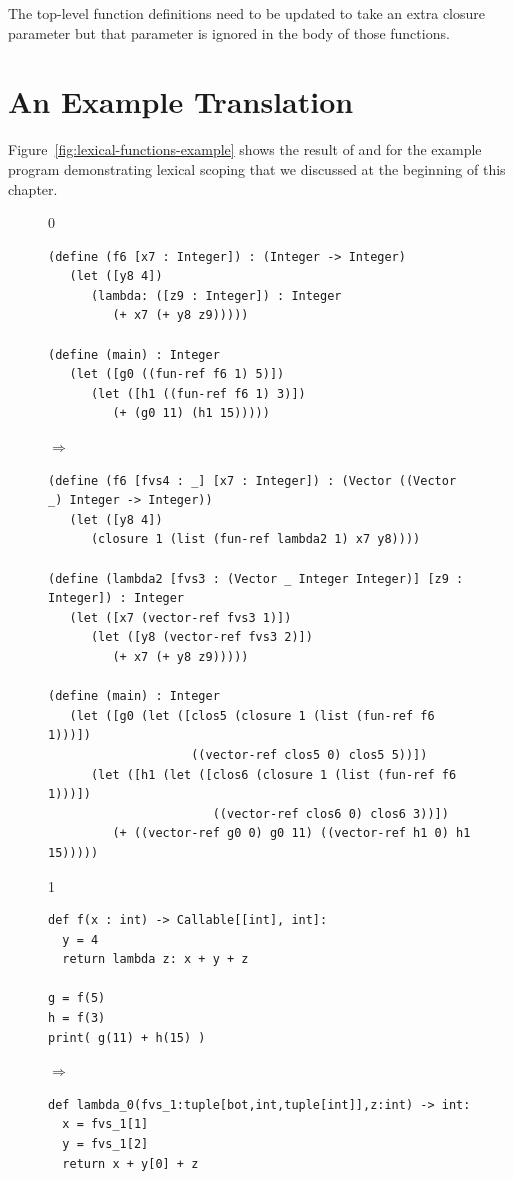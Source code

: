 \documentclass[7x10]{TimesAPriori_MIT}%
\def\racketEd{0}
\def\pythonEd{1}
\def\edition{0}
\numberwithin{theorem}{chapter}
\numberwithin{definition}{chapter}
\numberwithin{equation}{chapter}
\begin{document}
The top-level function definitions need to be updated to take an extra
closure parameter but that parameter is ignored in the body of those
functions.

\section{An Example Translation}
\label{sec:example-lambda}

Figure~\ref{fig:lexical-functions-example} shows the result of
 and  for the example
program demonstrating lexical scoping that we discussed at the
beginning of this chapter.


\begin{figure}[tbp]
  \begin{tcolorbox}[colback=white]
    \begin{minipage}{0.8\textwidth}
{\if\edition\racketEd
\begin{lstlisting}[basicstyle=\ttfamily\footnotesize]
(define (f6 [x7 : Integer]) : (Integer -> Integer)
   (let ([y8 4])
      (lambda: ([z9 : Integer]) : Integer
         (+ x7 (+ y8 z9)))))

(define (main) : Integer
   (let ([g0 ((fun-ref f6 1) 5)])
      (let ([h1 ((fun-ref f6 1) 3)])
         (+ (g0 11) (h1 15)))))
\end{lstlisting}
$\Rightarrow$
\begin{lstlisting}[basicstyle=\ttfamily\footnotesize]
(define (f6 [fvs4 : _] [x7 : Integer]) : (Vector ((Vector _) Integer -> Integer))
   (let ([y8 4])
      (closure 1 (list (fun-ref lambda2 1) x7 y8))))

(define (lambda2 [fvs3 : (Vector _ Integer Integer)] [z9 : Integer]) : Integer
   (let ([x7 (vector-ref fvs3 1)])
      (let ([y8 (vector-ref fvs3 2)])
         (+ x7 (+ y8 z9)))))

(define (main) : Integer
   (let ([g0 (let ([clos5 (closure 1 (list (fun-ref f6 1)))])
                    ((vector-ref clos5 0) clos5 5))])
      (let ([h1 (let ([clos6 (closure 1 (list (fun-ref f6 1)))])
                       ((vector-ref clos6 0) clos6 3))])
         (+ ((vector-ref g0 0) g0 11) ((vector-ref h1 0) h1 15)))))
\end{lstlisting}
\fi}
%
{\if\edition\pythonEd
\begin{lstlisting}
def f(x : int) -> Callable[[int], int]:
  y = 4
  return lambda z: x + y + z

g = f(5)
h = f(3)
print( g(11) + h(15) )
\end{lstlisting}
$\Rightarrow$
\begin{lstlisting}
def lambda_0(fvs_1:tuple[bot,int,tuple[int]],z:int) -> int:
  x = fvs_1[1]
  y = fvs_1[2]
  return x + y[0] + z


\end{lstlisting}}
\end{minipage}
\end{tcolorbox}
\end{figure}
\end{document}
